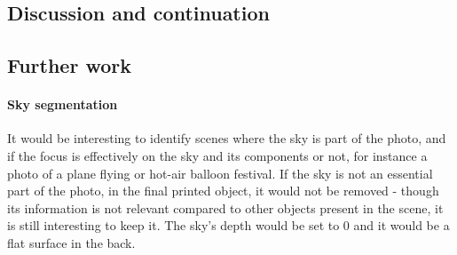\documentclass[12pt, letterpaper]{article}
\begin{document}
\begin{spacing}{1.15}
\section{Discussion and continuation}

\subsection{Further work}

\paragraph{Sky segmentation} It would be interesting to identify scenes where the sky is part of the photo, and if the focus is effectively on the sky and its components or not, for instance a 
photo of a plane flying or hot-air balloon festival. If the sky is not an essential part of the photo, in the final printed object, it would not be removed - though its information
is not relevant compared to other objects present in the scene, it is still interesting to keep it. The sky's depth would be set to 0 and it would be a flat surface in the back.


\end{spacing}
\end{document}
